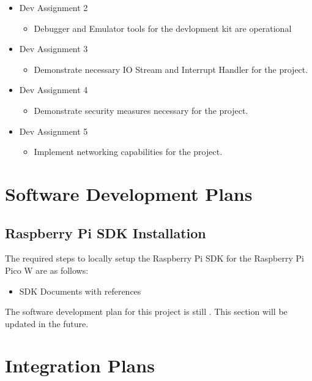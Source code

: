 {\begin{itemize}
    \item Dev Assignment 2
    \begin{itemize}
        \item Debugger and Emulator tools for the devlopment kit are operational
    \end{itemize}
    \item Dev Assignment 3
    \begin{itemize}
        \item Demonstrate necessary IO Stream and Interrupt Handler for the project.
    \end{itemize}
    \item Dev Assignment 4
    \begin{itemize}
        \item Demonstrate security measures necessary for the project.
    \end{itemize}
    \item Dev Assignment 5
    \begin{itemize}
        \item Implement networking capabilities for the project.
    \end{itemize}
\end{itemize}

\section{Software Development Plans}
\label{loc:SDP_SoftwareDevelopmentPlans}
% 

\subsection{Raspberry Pi SDK Installation}
The required steps to locally setup the Raspberry Pi SDK for the Raspberry Pi Pico W are as follows:

\begin{itemize}
    \item SDK Documents with references
\end{itemize}

The software development plan for this project is still \TBD. This section will be updated in the future.


\section{Integration Plans}
\label{loc:SDP_IntegrationPlans}
% 

}
